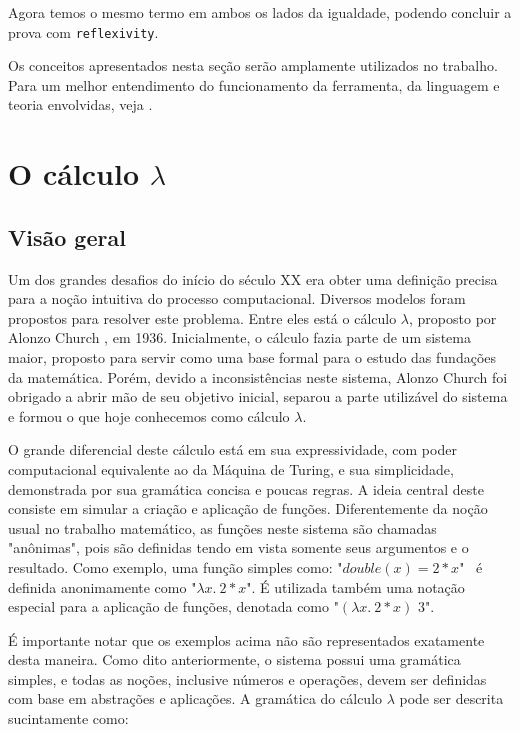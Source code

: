 Agora temos o mesmo termo em ambos os lados da igualdade, podendo concluir a
prova com \texttt{reflexivity}.

Os conceitos apresentados nesta seção serão amplamente utilizados no trabalho.
Para um melhor entendimento do funcionamento da ferramenta, da linguagem e
teoria envolvidas, veja \cite{pierce}.


\section{O cálculo $\lambda$}

\subsection{Visão geral}

Um dos grandes desafios do início do século XX era obter uma definição 
precisa para a noção intuitiva do processo computacional. Diversos modelos foram
propostos para resolver este problema. Entre eles está o cálculo $\lambda$,
proposto por Alonzo Church \cite{lambda_first}, em 1936. Inicialmente, o cálculo
fazia parte de um sistema maior, proposto para servir como uma base
formal para o estudo das fundações da matemática. Porém, devido a
inconsistências neste sistema, Alonzo Church foi obrigado a abrir mão de seu
objetivo inicial, separou a parte utilizável do sistema e formou o que hoje
conhecemos como cálculo $\lambda$.

O grande diferencial deste cálculo está em sua expressividade, com poder
computacional equivalente ao da Máquina de Turing, e sua simplicidade,
demonstrada por sua gramática concisa e poucas regras. A ideia central deste
consiste em simular a criação e aplicação de funções. Diferentemente da noção
usual no trabalho matemático, as funções neste sistema são chamadas "anônimas",
pois são definidas tendo em vista somente seus argumentos e o resultado. Como
exemplo, uma função simples como: "$double(x) = 2*x$" \ é definida anonimamente como
"$\lambda x.\ 2*x$". É utilizada também uma notação especial para a aplicação de
funções, denotada como "$ (\lambda x.\ 2*x)$  $3$".

É importante notar que os exemplos acima não são representados exatamente desta
maneira. Como dito anteriormente, o sistema possui uma gramática simples, e
todas as noções, inclusive números e operações, devem ser definidas com base em
abstrações e aplicações. A gramática do cálculo $\lambda$ pode ser descrita
sucintamente como:

